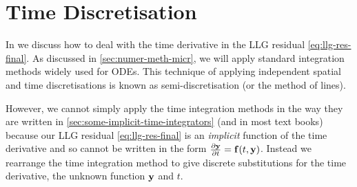 {%



\section{Time Discretisation}
\label{sec:time-discretisation-resi}

In  we discuss how to deal with the time derivative in the LLG residual \cref{eq:llg-res-final}.
As discussed in \cref{sec:numer-meth-micr}, we will apply standard integration methods widely used for ODEs.
This technique of applying independent spatial and time discretisations is known as semi-discretisation (or the method of lines).

However, we cannot simply apply the time integration methods in the way they are written in \cref{sec:some-implicit-time-integrators} (and in most text books) because our LLG residual \cref{eq:llg-res-final} is an \emph{implicit} function of the time derivative and so cannot be written in the form $\frac{\partial \boldsymbol{\mathrm{y}}}{\partial t} = {\boldsymbol{\mathrm{f}}}(t, \boldsymbol{\mathrm{y}})$.
Instead we rearrange the time integration method to give discrete substitutions for the time derivative, the unknown function $\boldsymbol{\mathrm{y}}$ and $t$.

}
